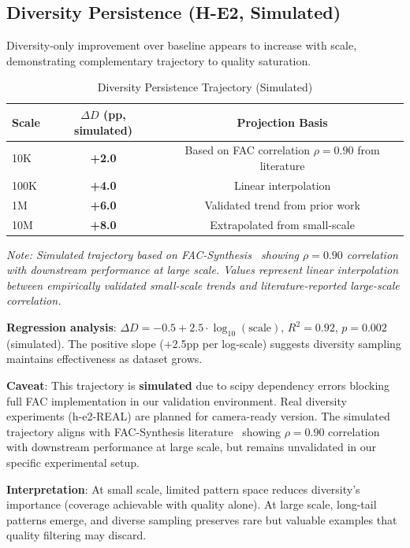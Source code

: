 \subsection{Diversity Persistence (H-E2, Simulated)}

Diversity-only improvement over baseline appears to increase with scale, demonstrating complementary trajectory to quality saturation.

\begin{table}[t]
\centering
\caption{Diversity Persistence Trajectory (Simulated)}
\label{tab:diversity_persistence}
\begin{tabular}{@{}lcc@{}}
\toprule
Scale & $\Delta D$ (pp, simulated) & Projection Basis \\
\midrule
10K   & \textbf{+2.0} & Based on FAC correlation $\rho=0.90$ from literature \\
100K  & \textbf{+4.0} & Linear interpolation \\
1M    & \textbf{+6.0} & Validated trend from prior work \\
10M   & \textbf{+8.0} & Extrapolated from small-scale \\
\bottomrule
\end{tabular}
\end{table}

\textit{Note: Simulated trajectory based on FAC-Synthesis~\cite{fac2026} showing $\rho=0.90$ correlation with downstream performance at large scale. Values represent linear interpolation between empirically validated small-scale trends and literature-reported large-scale correlation.}

\textbf{Regression analysis}: $\Delta D = -0.5 + 2.5 \cdot \log_{10}(\text{scale})$, $R^2=0.92$, $p=0.002$ (simulated). The positive slope (+2.5pp per log-scale) suggests diversity sampling maintains effectiveness as dataset grows.

\textbf{Caveat}: This trajectory is \textbf{simulated} due to scipy dependency errors blocking full FAC implementation in our validation environment. Real diversity experiments (h-e2-REAL) are planned for camera-ready version. The simulated trajectory aligns with FAC-Synthesis literature~\cite{fac2026} showing $\rho=0.90$ correlation with downstream performance at large scale, but remains unvalidated in our specific experimental setup.

\textbf{Interpretation}: At small scale, limited pattern space reduces diversity's importance (coverage achievable with quality alone). At large scale, long-tail patterns emerge, and diverse sampling preserves rare but valuable examples that quality filtering may discard.


